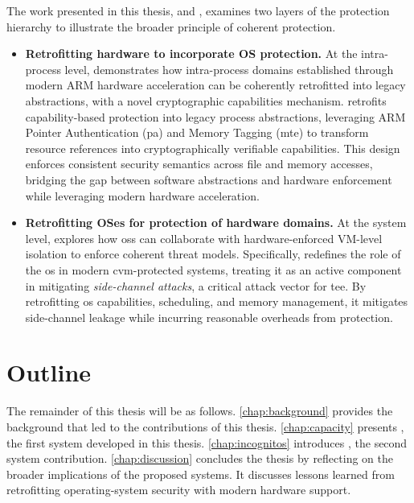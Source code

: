 The work presented in this thesis, \capacity and \incognitos, examines two layers of the protection hierarchy to illustrate the broader principle of coherent protection.

% 	

\begin{itemize}
	\item[-] \textbf{Retrofitting hardware to incorporate OS protection.}
	      At the intra-process level, \capacity demonstrates how intra-process domains established through modern ARM hardware acceleration can be coherently
	      retrofitted into legacy abstractions, with a novel cryptographic capabilities mechanism.
	      \capacity retrofits capability-based protection into legacy process abstractions, leveraging ARM Pointer Authentication (\gls{pa}) and Memory Tagging (\gls{mte}) to transform resource references into cryptographically verifiable capabilities.
	      This design enforces consistent security semantics across file and memory accesses, bridging the gap between software abstractions and hardware enforcement while leveraging modern hardware acceleration.
	\item[-] \textbf{Retrofitting OSes for protection of hardware domains.}
	      At the system level, \incognitos explores how \glspl{os} can collaborate with hardware-enforced VM-level isolation to enforce coherent threat models.
	      Specifically, \incognitos redefines the role of the \gls{os} in modern \gls{cvm}-protected systems, treating it as an active component in mitigating \emph{side-channel attacks}, a critical attack vector for \gls{tee}.
	      By retrofitting \gls{os} capabilities, scheduling, and memory management, it mitigates side-channel leakage while incurring reasonable overheads from protection.
\end{itemize}

\clearpage

\section{Outline}

The remainder of this thesis will be as follows.
\cref{chap:background} provides the background that led to the contributions of this thesis.
\cref{chap:capacity} presents \capacity{}, the first system developed in this thesis.
\cref{chap:incognitos} introduces \incognitos{}, the second system contribution.
\cref{chap:discussion} concludes the thesis by
reflecting on the broader implications of the proposed systems.
It discusses lessons learned from retrofitting operating-system security with modern hardware support.


